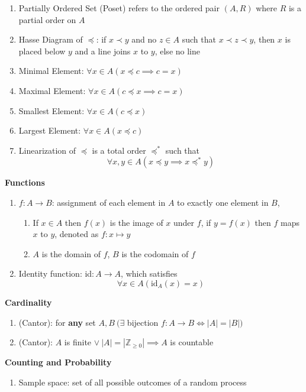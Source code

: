 \documentclass[landscape, a4paper]{article}
\let\geq\geqslant
\newcommand{\Z}{\mathbb{Z}}
\newcommand{\Or}{\vee}
\newcommand{\heading}[1]{
    \noindent\textbf{#1}
}
\newenvironment{wenumerate}{\begin{enumerate}[wide, labelindent=2pt]}{\end{enumerate}}
\begin{document}
\begin{multicols*}{4}
\begin{wenumerate}
        \item Partially Ordered Set (Poset) refers to the ordered pair $(A, R)$ where $R$ is a partial order on $A$
        \item Hasse Diagram of $\preccurlyeq$: if $x\prec y$ and no $z\in A$ such that $x\prec z\prec y$, then $x$ is placed below $y$ and a line joins $x$ to $y$, else no line
        \item Minimal Element: $\forall x\in A(x\preccurlyeq c\implies c = x)$
        \item Maximal Element: $\forall x\in A(c\preccurlyeq x\implies c = x)$
        \item Smallest Element: $\forall x\in A(c\preccurlyeq x)$
        \item Largest Element: $\forall x\in A(x\preccurlyeq c)$
        \item Linearization of $\preccurlyeq$ is a total order $\preccurlyeq^*$ such that
        \[\forall x,y\in A (x\preccurlyeq y \implies x \preccurlyeq^* y)\]
    \end{wenumerate}
    \heading{Functions}
    \begin{wenumerate}
        \item $f:A\rightarrow B$: assignment of each element in $A$ to exactly one element in $B$,
        \begin{enumerate}
            \item If $x\in A$ then $f(x)$ is the image of $x$ under $f$, if $y=f(x)$ then $f$ maps $x$ to $y$, denoted as $f:x\mapsto y$
            \item $A$ is the domain of $f$, $B$ is the codomain of $f$
        \end{enumerate}
        \item Identity function: id$:A\rightarrow A$, which satisfies
        \[
            \forall x\in A \left(\text{id}_A(x)=x\right)
        \]
    \end{wenumerate}
    \heading{Cardinality}
    \begin{wenumerate}
        \item (Cantor): for \textbf{any} set $A,B\ (\exists$ bijection $f:A\rightarrow B \iff |A|=|B|)$
        \item (Cantor): $A$ is finite $\Or\ |A|=|\Z_{\geq 0}|\implies A$ is countable
    \end{wenumerate}
    \heading{Counting and Probability}
    \begin{wenumerate}
        \item Sample space: set of all possible outcomes of a random process

\end{wenumerate}
\end{multicols*}
\end{document}

